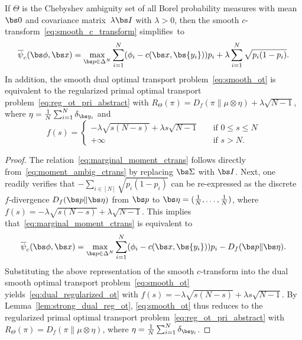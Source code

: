 \documentclass[11pt, a4paper, oneside, reqno]{article}
\begin{document}
	
	\begin{proposition} 
	\label{prop:chebyshev-regularization}
	If $\Theta$ is the Chebyshev ambiguity set of all Borel probability measures with mean $\bs 0$ and covariance matrix~$\lambda\bs I$ with $\lambda> 0$, then the smooth $c$-transform~\eqref{eq:smooth_c_transform} simplifies~to
		\begin{equation}
		\label{eq:marginal_moment_ctrans}
		\overline \psi_c(\bs \phi, \bs x) = \max_{ \bs p\in \Delta^N} \sum\limits_{i=1}^N(\phi_i -c(\bs x, \bs {y_i})) p_i + \lambda\sum_{i=1}^N\sqrt{p_i(1-p_i)}.
		\end{equation}
		In addition, the smooth dual optimal transport problem~\eqref{eq:smooth_ot} is equivalent to the regularized primal optimal transport problem~\eqref{eq:reg_ot_pri_abstract} with $R_\Theta(\pi) = D_f(\pi \| \mu \otimes \eta)+ \lambda \sqrt{N-1}$, where $\eta = \frac{1}{N} \sum_{i =1}^N \delta_{\bs y_i}$ and \begin{equation}
		 \label{eq:chebychev_f}
		 f(s) = \begin{cases}
		-\lambda\sqrt{s(N - s)} + \lambda s \sqrt{N-1} \quad & \text{if }0 \leq s \leq N\\
		+\infty & \text{if }s>N.
		\end{cases}\end{equation}
	\end{proposition}
	\begin{proof}
		The relation~\eqref{eq:marginal_moment_ctrans} follows directly from~\eqref{eq:moment_ambig_ctrans} by replacing $\bs \Sigma$ with $\bs I$. Next, one readily verifies that $-\sum_{i \in [N]} \sqrt{p_i(1-p_i)} $ can be re-expressed as the discrete $f$-divergence $D_f(\bs p\| \bs \eta)$ from $\bs p$ to $\bs\eta=(\frac{1}{N},\ldots,\frac{1}{N})$, where $f(s) =-\lambda \sqrt{s (N - s)}+ \lambda \sqrt{N-1}$. This implies that~\eqref{eq:marginal_moment_ctrans} is equivalent to
		\[
		\overline \psi_c(\bs \phi, \bs x) = \max_{ \bs p\in \Delta^N} \sum\limits_{i=1}^N(\phi_i -c(\bs x, \bs {y_i})) p_i -  D_f(\bs p\| \bs \eta).
		\]
		Substituting the above representation of the smooth $c$-transform into the dual smooth optimal transport problem~\eqref{eq:smooth_ot} yields~\eqref{eq:dual_regularized_ot} with $f(s)= -\lambda \sqrt{s (N - s)} +\lambda s \sqrt{N-1} $. By Lemma~\ref{lem:strong_dual_reg_ot},  \eqref{eq:smooth_ot} thus reduces to the regularized primal optimal transport problem~\eqref{eq:reg_ot_pri_abstract} with $R_\Theta(\pi) = D_f(\pi \| \mu \otimes \eta)$, where $\eta = \frac{1}{N} \sum_{i =1}^N \delta_{\bs y_i}$.
	\end{proof}
	
\end{document}
